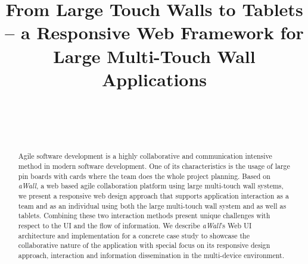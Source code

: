 \documentclass{sigchi}
\begin{document}
\title{From Large Touch Walls to Tablets -- a Responsive Web Framework for Large Multi-Touch Wall Applications}

\author{%
  \\
  \\
  \\
}

\maketitle



\begin{abstract}
Agile software development is a highly collaborative and communication intensive method in modern software development. One of its characteristics is the usage of large pin boards with cards where the team does the whole project planning. Based on \textit{aWall}, a web based agile collaboration platform using large multi-touch wall systems, we present a responsive web design approach that supports application interaction as a team and as an individual using both the large multi-touch wall system and as well as tablets. Combining these two interaction methods present unique challenges with respect to the UI and the flow of information. We describe \textit{aWall}'s Web UI architecture and implementation for a concrete case study to showcase the collaborative nature of the application with special focus on its responsive design approach, interaction and information dissemination in the multi-device environment.
\end{abstract}
\end{document}
